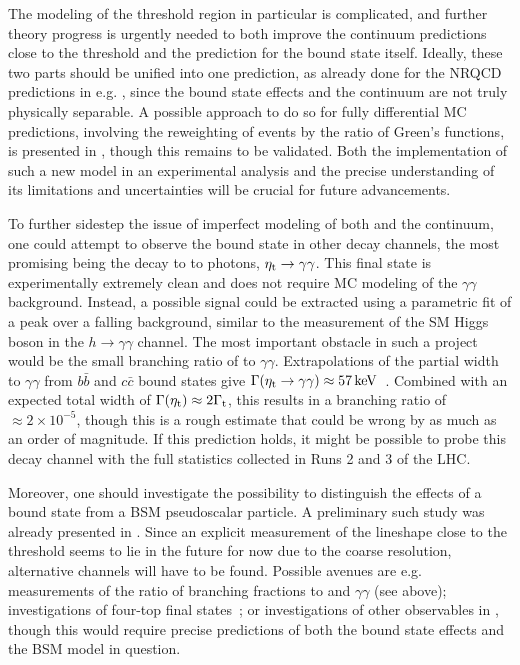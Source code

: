 The modeling of the \ttbar threshold region in particular is complicated, and further theory progress is urgently needed to both improve the \ttbar continuum predictions close to the \ttbar threshold and the prediction for the \ttbar bound state itself. Ideally, these two parts should be unified into one prediction, as already done for the NRQCD predictions in e.g. , since the bound state effects and the continuum are not truly physically separable. A possible approach to do so for fully differential MC predictions, involving the reweighting of \ttbar events by the ratio of Green's functions, is presented in , though this remains to be validated.
Both the implementation of such a new \etat model in an experimental analysis and the precise understanding of its limitations and uncertainties will be crucial for future advancements.


To further sidestep the issue of imperfect modeling of both \etat and the \ttbar continuum, one could attempt to observe the \ttbar bound state in other decay channels, the most promising being the decay to to photons, $\mathrm{\eta_t} \rightarrow \gamma\gamma$. This final state is experimentally extremely clean and does not require MC modeling of the $\gamma\gamma$ background. Instead, a possible signal could be extracted using a parametric fit of a peak over a falling background, similar to the measurement of the SM Higgs boson in the $h \rightarrow \gamma\gamma$ channel. The most important obstacle in such a project would be the small branching ratio of \etat to $\gamma\gamma$. Extrapolations of the partial width to $\gamma\gamma$ from $b\bar{b}$ and $c\bar{c}$ bound states give $\Gamma(\mathrm{\eta_t} \rightarrow \gamma\gamma) \approx \SI{57}{\kilo\electronvolt}$~\cite{Jiang:2024fyw}. Combined with an expected total width of $\Gamma(\mathrm{\eta_t}) \approx 2 \Gamma_{\mathrm{t}}$, this results in a branching ratio of $\approx 2 \times 10^{-5}$, though this is a rough estimate that could be wrong by as much as an order of magnitude. If this prediction holds, it might be possible to probe this decay channel with the full statistics collected in Runs 2 and 3 of the LHC.%

\smallskip

Moreover, one should investigate the possibility to distinguish the effects of a \ttbar bound state from a BSM pseudoscalar particle. A preliminary such study was already presented in . Since an explicit measurement of the lineshape close to the \ttbar threshold seems to lie in the future for now due to the coarse \mtt resolution, alternative channels will have to be found. Possible avenues are e.g. measurements of the ratio of branching fractions to \ttbar and $\gamma\gamma$ (see above); investigations of four-top final states~\cite{CMS:2023ftu,ATLAS:2023ajo}; or investigations of other observables in \ttbar, though this would require precise predictions of both the bound state effects and the BSM model in question.

